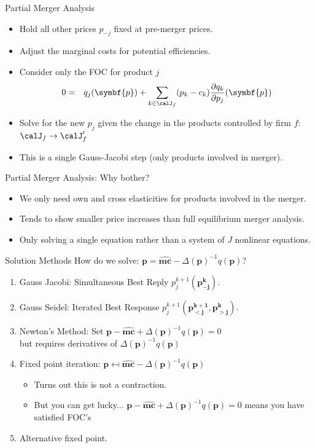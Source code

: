 \begin{frame}{Partial Merger Analysis}
\begin{itemize}
\item Hold all other prices $p_{-j}$ fixed at \alert{pre-merger} prices.
\item Adjust the marginal costs for potential efficiencies.
\item Consider only the FOC for product $j$
\begin{eqnarray*}
0&=& q_j(\symbf{p}) + \sum_{k \in \calJ_f} (p_k - c_k) \frac{\partial q_{k}}{\partial p_j}(\symbf{p})
\end{eqnarray*}
\item Solve for the new $p_j$ given the change in the products controlled by firm $f$: $\calJ_f \rightarrow \calJ_f'$
\item This is a single Gauss-Jacobi step (only products involved in merger).
\end{itemize}
\end{frame} 

\begin{frame}{Partial Merger Analysis: Why bother?}
\begin{itemize}
\item We only need own and cross elasticities for products involved in the merger.
\item Tends to show smaller price increases than full equilibrium merger analysis.
\item Only solving a single equation rather than a system of $J$ nonlinear equations.
\end{itemize}
\end{frame} 



\begin{frame}{Solution Methods}
How do we solve: $\symbf{p} = \widehat{\symbf{mc}} - \Delta(\symbf{p})^{-1}q(\symbf{p})$?
\begin{enumerate}
\item Gauss Jacobi: Simultaneous Best Reply  $p_j^{k+1}(\symbf{p_{-j}^k})$.
\item Gauss Seidel: Iterated Best Response  $p_j^{k+1}(\symbf{p_{<j}^{k+1}},\symbf{p_{>j}^{k}})$.
\item Newton's Method: Set $\symbf{p} - \widehat{\symbf{mc}} + \Delta(\symbf{p})^{-1}q(\symbf{p})=0$\\ but requires derivatives of $\Delta(\symbf{p})^{-1}q(\symbf{p})$
\item Fixed point iteration: $\symbf{p} \mapsfrom \widehat{\symbf{mc}} - \Delta(\symbf{p})^{-1}q(\symbf{p})$
\begin{itemize}
\item Turns out this is \alert{not a contraction}.
\item But you can get lucky... $\symbf{p} - \widehat{\symbf{mc}} + \Delta(\symbf{p})^{-1}q(\symbf{p})=0$ means you have satisfied FOC's
\end{itemize}
\item Alternative fixed point.
\end{enumerate}
\end{frame} 

